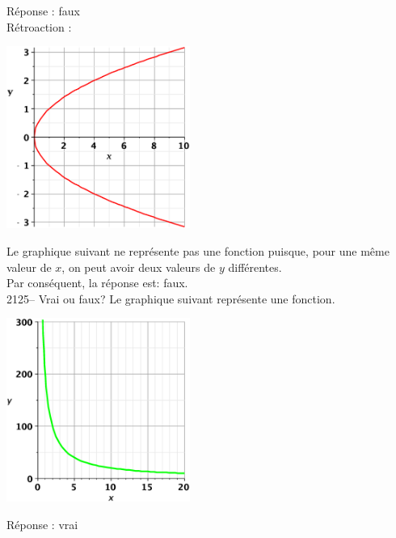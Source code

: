 \documentclass[letterpaper, 12pt]{article}
\begin{document}
R\'eponse : faux\\

R\'etroaction :\\
\begin{center}
 \includegraphics[width=6cm,bb=20 118 575 673]{Q2124.eps}
\end{center}
Le graphique suivant ne repr\'esente pas une fonction puisque, pour une m\^eme valeur de $x$, on peut avoir deux valeurs de $y$ diff\'erentes.\\
Par cons\'equent, la r\'eponse est: faux.\\

2125-- Vrai ou faux? Le graphique suivant repr\'esente une fonction. \\
\begin{center}
 \includegraphics[width=6cm,bb=20 118 575 673]{Q2125.eps}
\end{center}

R\'eponse : vrai\\
\end{document}
